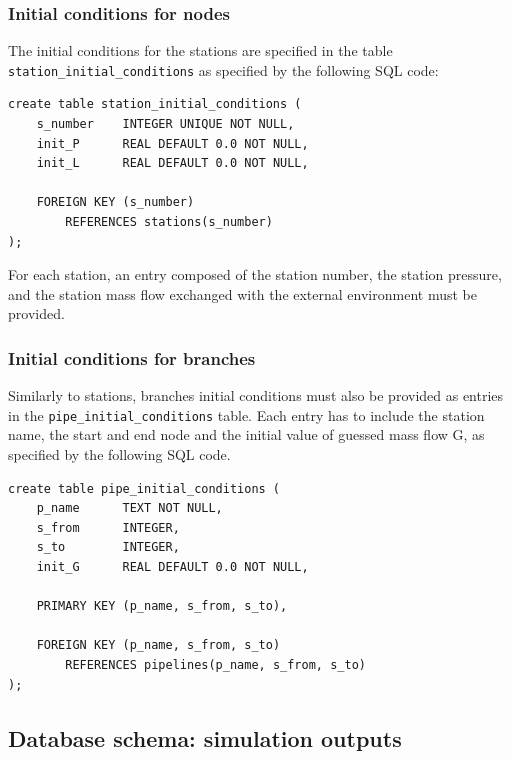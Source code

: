 \subsubsection{Initial conditions for nodes}
The initial conditions for the stations are specified in the table \texttt{station\_initial\_conditions}
as specified by the following SQL code:
\begin{verbatim}
create table station_initial_conditions (
    s_number    INTEGER UNIQUE NOT NULL,
    init_P      REAL DEFAULT 0.0 NOT NULL,
    init_L      REAL DEFAULT 0.0 NOT NULL,

    FOREIGN KEY (s_number)
        REFERENCES stations(s_number)
);
\end{verbatim}
For each station, an entry composed of the station number, the station pressure, and the
station mass flow exchanged with the external environment must be provided.

\subsubsection{Initial conditions for branches}

Similarly to stations, branches initial conditions must also be provided as entries
in the \texttt{pipe\_initial\_conditions} table. Each entry has to include the
station name, the start and end node and the initial value of guessed mass flow G, as specified by the following SQL code.
\begin{verbatim}
create table pipe_initial_conditions (
    p_name      TEXT NOT NULL,
    s_from      INTEGER,
    s_to        INTEGER,
    init_G      REAL DEFAULT 0.0 NOT NULL,
    
    PRIMARY KEY (p_name, s_from, s_to),

    FOREIGN KEY (p_name, s_from, s_to)
        REFERENCES pipelines(p_name, s_from, s_to)
);
\end{verbatim}
\subsection{Database schema: simulation outputs}

